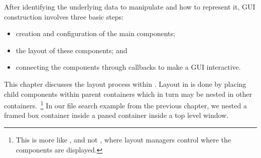 


After identifying the underlying data to manipulate and how to
represent it, GUI construction involves three basic steps:
\begin{itemize}
\item creation and configuration of the main components;
\item the layout of these components; and
\item connecting the components through callbacks to make a GUI interactive.
\end{itemize}

This chapter discusses the layout process within
. Layout in  is done by placing child
components within parent containers which in turn may be nested in
other containers.~\footnote{This is more like \GTK, and not \Qt, where
  layout managers control where the components are displayed.} In our
file search example from the previous chapter, we nested a framed box
container inside a paned container inside a top level window.  

